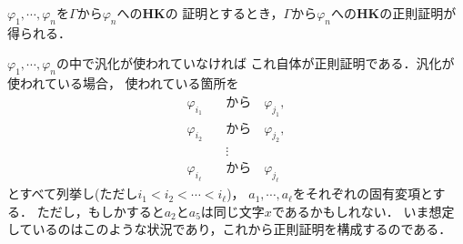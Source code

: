 	\begin{screen}
		\begin{metathm}[どんな証明も正則化できる]
			$\varphi_{1},\cdots,\varphi_{n}$を$\Gamma$から$\varphi_{n}$への{\bf HK}の
			証明とするとき，$\Gamma$から$\varphi_{n}$への{\bf HK}の正則証明が得られる．
		\end{metathm}
	\end{screen}
	
	\begin{metaprf}
		$\varphi_{1},\cdots,\varphi_{n}$の中で汎化が使われていなければ
		これ自体が正則証明である．汎化が使われている場合，
		使われている箇所を
		\begin{align}
			\varphi_{i_{1}} \quad &\mbox{から} \quad \varphi_{j_{1}}, \\
			\varphi_{i_{2}} \quad &\mbox{から} \quad \varphi_{j_{2}}, \\
			&\vdots \\
			\varphi_{i_{\ell}} \quad &\mbox{から} \quad \varphi_{j_{\ell}}
		\end{align}
		とすべて列挙し(ただし$i_{1} < i_{2} < \cdots < i_{\ell}$)，
		$a_{1},\cdots,a_{\ell}$をそれぞれの固有変項とする．
		ただし，もしかすると$a_{2}$と$a_{5}$は同じ文字$x$であるかもしれない．
		いま想定しているのはこのような状況であり，これから正則証明を構成するのである．
		

\end{metaprf}

